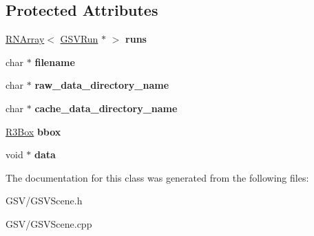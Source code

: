 \subsection*{Protected Attributes}
\begin{DoxyCompactItemize}
\item 
\hyperlink{class_r_n_array}{R\+N\+Array}$<$ \hyperlink{class_g_s_v_run}{G\+S\+V\+Run} $\ast$ $>$ {\bfseries runs}\hypertarget{class_g_s_v_scene_a191469e1dea4d64baf9360f4135abda7}{}\label{class_g_s_v_scene_a191469e1dea4d64baf9360f4135abda7}

\item 
char $\ast$ {\bfseries filename}\hypertarget{class_g_s_v_scene_a840746395403c5e00ee20be7de3e7a4b}{}\label{class_g_s_v_scene_a840746395403c5e00ee20be7de3e7a4b}

\item 
char $\ast$ {\bfseries raw\+\_\+data\+\_\+directory\+\_\+name}\hypertarget{class_g_s_v_scene_a34f451fb84ca1c892511ef6e5dc73e2f}{}\label{class_g_s_v_scene_a34f451fb84ca1c892511ef6e5dc73e2f}

\item 
char $\ast$ {\bfseries cache\+\_\+data\+\_\+directory\+\_\+name}\hypertarget{class_g_s_v_scene_ab8cc5286c81020482e7da3df63482015}{}\label{class_g_s_v_scene_ab8cc5286c81020482e7da3df63482015}

\item 
\hyperlink{class_r3_box}{R3\+Box} {\bfseries bbox}\hypertarget{class_g_s_v_scene_a1581f067b73f76490dc915f351c70ee0}{}\label{class_g_s_v_scene_a1581f067b73f76490dc915f351c70ee0}

\item 
void $\ast$ {\bfseries data}\hypertarget{class_g_s_v_scene_a2f5147787a60265e51b297109b430cac}{}\label{class_g_s_v_scene_a2f5147787a60265e51b297109b430cac}

\end{DoxyCompactItemize}


The documentation for this class was generated from the following files\+:\begin{DoxyCompactItemize}
\item 
G\+S\+V/G\+S\+V\+Scene.\+h\item 
G\+S\+V/G\+S\+V\+Scene.\+cpp\end{DoxyCompactItemize}
